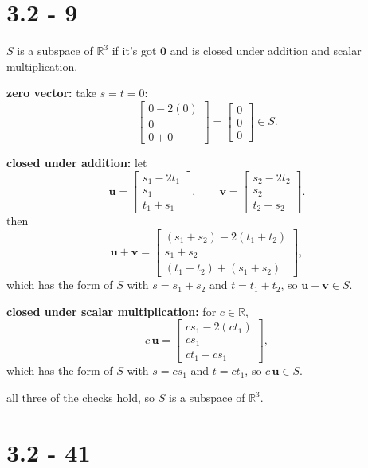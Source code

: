 \documentclass{article}
\begin{document}
\section*{3.2 - 9}

$S$ is a subspace of $\mathbb{R}^3$ if it's got $\mathbf{0}$ and is closed
under addition and scalar multiplication.

\textbf{zero vector:} take $s = t = 0$:
\[
\begin{bmatrix} 0 - 2(0) \\ 0 \\ 0 + 0 \end{bmatrix}
= \begin{bmatrix} 0 \\ 0 \\ 0 \end{bmatrix} \in S.
\]

\textbf{closed under addition:} let
\[
\mathbf{u} = \begin{bmatrix} s_1 - 2t_1 \\ s_1 \\ t_1 + s_1 \end{bmatrix},
\qquad
\mathbf{v} = \begin{bmatrix} s_2 - 2t_2 \\ s_2 \\ t_2 + s_2 \end{bmatrix}.
\]
then
\[
\mathbf{u} + \mathbf{v}
= \begin{bmatrix} (s_1 + s_2) - 2(t_1 + t_2) \\ s_1 + s_2 \\ (t_1 + t_2) + (s_1 + s_2) \end{bmatrix},
\]
which has the form of $S$ with $s = s_1 + s_2$ and $t = t_1 + t_2$, so
$\mathbf{u} + \mathbf{v} \in S$.

\textbf{closed under scalar multiplication:} for $c \in \mathbb{R}$,
\[
c\,\mathbf{u}
= \begin{bmatrix} cs_1 - 2(ct_1) \\ cs_1 \\ ct_1 + cs_1 \end{bmatrix},
\]
which has the form of $S$ with $s = cs_1$ and $t = ct_1$, so $c\,\mathbf{u} \in S$.

all three of the checks hold, so $S$ is a subspace of $\mathbb{R}^3$.

\section*{3.2 - 41}
\end{document}
